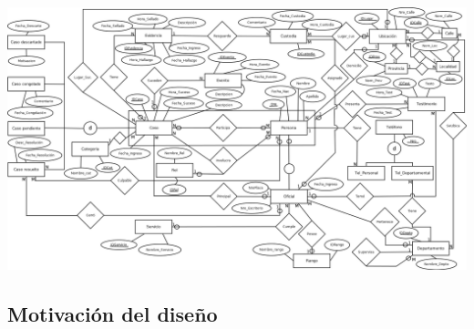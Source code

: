 \documentclass{article}
\theoremstyle{definition}
\theoremstyle{remark}
\begin{document}
\includegraphics[width=\textheight,height=\textwidth*11/10,angle=90]{der.png}

\subsection{Motivación del diseño}
\end{document}
